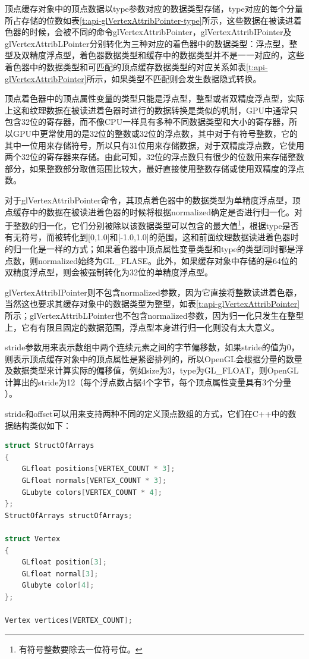 顶点缓存对象中的顶点数据以type参数对应的数据类型存储，type对应的每个分量所占存储的位数如表\ref{t:api-glVertexAttribPointer-type}所示，这些数据在被读进着色器的时候，会被不同的命令glVertexAttribPointer，glVertexAttribIPointer及glVertexAttribLPointer分别转化为三种对应的着色器中的数据类型：浮点型，整型及双精度浮点型，着色器数据类型和缓存中的数据类型并不是一一对应的，这些着色器中的数据类型和可匹配的顶点缓存数据类型的对应关系如表\ref{t:api-glVertexAttribPointer}所示，如果类型不匹配则会发生数据隐式转换。

\begin{myshaded}
顶点着色器中的顶点属性变量的类型只能是浮点型，整型或者双精度浮点型，实际上这和纹理数据在被读进着色器时进行的数据转换是类似的机制，GPU中通常只包含32位的寄存器，而不像CPU一样具有多种不同数据类型和大小的寄存器，所以GPU中更常使用的是32位的整数或32位的浮点数，其中对于有符号整数，它的其中一位用来存储符号，所以只有31位用来存储数据，对于双精度浮点数，它使用两个32位的寄存器来存储。由此可知，32位的浮点数只有很少的位数用来存储整数部分，如果整数部分取值范围比较大，最好直接使用整数存储或使用双精度的浮点数。
\end{myshaded}

对于glVertexAttribPointer命令，其顶点着色器中的数据类型为单精度浮点型，顶点缓存中的数据在被读进着色器的时候将根据normalized确定是否进行归一化。对于整数的归一化，它们分别被除以该数据类型可以包含的最大值\footnote{有符号整数要除去一位符号位。}，根据type是否有无符号，而被转化到[0,1.0]和[-1.0,1.0]的范围，这和前面纹理数据读进着色器时的归一化是一样的方式；如果着色器中顶点属性变量类型和type的类型同时都是浮点数，则normalized始终为GL\_FLASE。此外，如果缓存对象中存储的是64位的双精度浮点型，则会被强制转化为32位的单精度浮点型。

glVertexAttribIPointer则不包含normalized参数，因为它直接将整数读进着色器，当然这也要求其缓存对象中的数据类型为整型，如表\ref{t:api-glVertexAttribPointer}所示；glVertexAttribLPointer也不包含normalized参数，因为归一化只发生在整型上，它有有限且固定的数据范围，浮点型本身进行归一化则没有太大意义。

stride参数用来表示数组中两个连续元素之间的字节偏移数，如果stride的值为0，则表示顶点缓存对象中的顶点属性是紧密排列的，所以OpenGL会根据分量的数量及数据类型来计算实际的偏移值，例如size为3，type为GL\_FLOAT，则OpenGL计算出的stride为12（每个浮点数占据4个字节，每个顶点属性变量具有3个分量 ）。

stride和offset可以用来支持两种不同的定义顶点数组的方式，它们在C++中的数据结构类似如下：

\begin{lstlisting}[language=C++]
struct StructOfArrays
{
	GLfloat positions[VERTEX_COUNT * 3];
	GLfloat normals[VERTEX_COUNT * 3];
	GLubyte colors[VERTEX_COUNT * 4];
};
StructOfArrays structOfArrays;

struct Vertex
{
	GLfloat position[3];
	GLfloat normal[3];
	Glubyte color[4];
};

Vertex vertices[VERTEX_COUNT];
\end{lstlisting}

